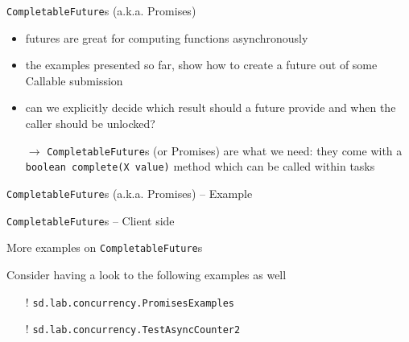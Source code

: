 \documentclass[presentation]{beamer}\mode<presentation>{\usetheme{AMSBolognaFC}}
\begin{document}
\begin{frame}[c,allowframebreaks]{\texttt{CompletableFuture}s (a.k.a. Promises)}

	\begin{itemize}
		\item futures are great for computing functions \alert{asynchronously}

		\medskip

		\item the examples presented so far, show how to create a future out of some Callable submission

		\medskip

		\item can we explicitly decide which result should a future provide and when the caller should be unlocked?

		\bigskip

		\item[$\rightarrow$] \texttt{\alert{CompletableFuture}}s (or Promises) are what we need: they come with a \texttt{boolean complete(X value)} method which can be called within tasks
	\end{itemize}

	\framebreak

	

\end{frame}

\begin{frame}[c]{\texttt{CompletableFuture}s (a.k.a. Promises) -- Example}

	

\end{frame}

\begin{frame}[c]{\texttt{CompletableFuture}s -- Client side}

	

\end{frame}

\begin{frame}[c]{More examples on \texttt{CompletableFuture}s}

	Consider having a look to the following examples as well
	\begin{itemize}
		\item[!] \texttt{sd.lab.concurrency.\alert{PromisesExamples}}
		\item[!] \texttt{sd.lab.concurrency.\alert{TestAsyncCounter2}}
	\end{itemize}

\end{frame}
\end{document}
